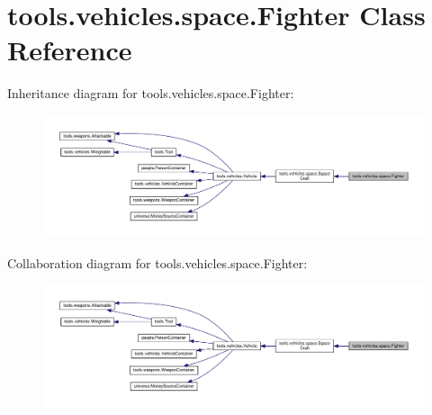 \hypertarget{classtools_1_1vehicles_1_1space_1_1_fighter}{}\section{tools.\+vehicles.\+space.\+Fighter Class Reference}
\label{classtools_1_1vehicles_1_1space_1_1_fighter}


Inheritance diagram for tools.\+vehicles.\+space.\+Fighter\+:
\nopagebreak
\begin{figure}[H]
\begin{center}
\leavevmode
\includegraphics[width=350pt]{classtools_1_1vehicles_1_1space_1_1_fighter__inherit__graph}
\end{center}
\end{figure}


Collaboration diagram for tools.\+vehicles.\+space.\+Fighter\+:
\nopagebreak
\begin{figure}[H]
\begin{center}
\leavevmode
\includegraphics[width=350pt]{classtools_1_1vehicles_1_1space_1_1_fighter__coll__graph}
\end{center}
\end{figure}
